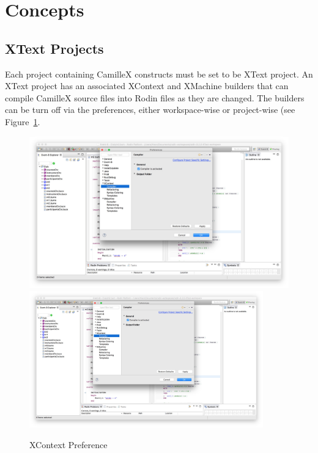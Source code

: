 \section{Concepts}
\label{sec:concepts}

\subsection{XText Projects}
\label{sec:xtext-projects}

Each project containing CamilleX constructs must be set to be XText project.  An XText project has an associated XContext and XMachine builders that can compile CamilleX source files into Rodin files as they are changed.  The builders can be turn off via the preferences, either workspace-wise or project-wise (see Figure~\ref{fig:XContextPreference}.
\begin{figure}[!htbp]
  \centering
  \ifplastex
  \includegraphics[width=512]{figures/XContextPreference}
  \else
  \includegraphics[width=0.9\textwidth]{figures/XContextPreference}
  \fi
  \caption{XContext Preference}
  \label{fig:XContextPreference}
\end{figure}

